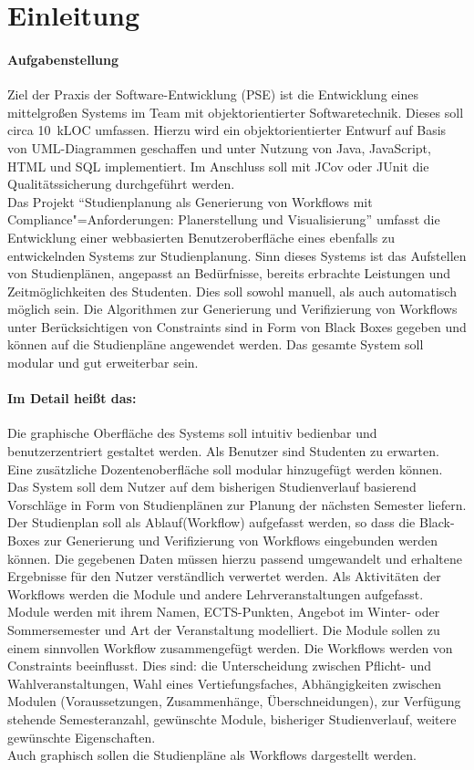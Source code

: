 \section{Einleitung}
\paragraph{Aufgabenstellung}
Ziel der Praxis der Software-Entwicklung (PSE) ist die Entwicklung eines mittelgroßen Systems im Team mit objektorientierter Softwaretechnik. Dieses soll circa 10~kLOC umfassen. Hierzu wird ein objektorientierter Entwurf auf Basis von UML-Diagrammen geschaffen und unter Nutzung von Java, JavaScript, HTML und SQL implementiert. Im Anschluss soll mit JCov oder JUnit die Qualitätssicherung durchgeführt werden.\\
Das Projekt \enquote{Studienplanung als Generierung von Workflows mit Compliance"=Anforderungen: Planerstellung und Visualisierung} umfasst die Entwicklung einer webbasierten Benutzeroberfläche eines ebenfalls zu entwickelnden Systems zur Studienplanung. Sinn dieses Systems ist das Aufstellen von Studienplänen, angepasst an Bedürfnisse, bereits erbrachte Leistungen und Zeitmöglichkeiten des Studenten. Dies soll sowohl manuell, als auch automatisch möglich sein. Die Algorithmen zur Generierung und Verifizierung von Workflows unter Berücksichtigen von Constraints sind in Form von Black Boxes gegeben und können auf die Studienpläne angewendet werden. Das gesamte System soll modular und gut erweiterbar sein.\\
\paragraph{Im Detail heißt das:}
Die graphische Oberfläche des Systems soll intuitiv bedienbar und benutzerzentriert gestaltet werden. Als Benutzer sind Studenten zu erwarten. Eine zusätzliche Dozentenoberfläche soll modular hinzugefügt werden können. Das System soll dem Nutzer auf dem bisherigen Studienverlauf basierend Vorschläge in Form von Studienplänen zur Planung der nächsten Semester liefern. Der Studienplan soll als Ablauf(Workflow) aufgefasst werden, so dass die Black-Boxes zur Generierung und Verifizierung von Workflows eingebunden werden können. Die gegebenen Daten müssen hierzu passend umgewandelt und erhaltene Ergebnisse für den Nutzer verständlich verwertet werden. Als Aktivitäten der Workflows werden die Module und andere Lehrveranstaltungen aufgefasst. Module werden mit ihrem Namen, ECTS-Punkten, Angebot im Winter- oder Sommersemester und Art der Veranstaltung modelliert. Die Module sollen zu einem sinnvollen Workflow zusammengefügt werden. Die Workflows werden von Constraints beeinflusst. Dies sind: die Unterscheidung zwischen Pflicht- und Wahlveranstaltungen, Wahl eines Vertiefungsfaches, Abhängigkeiten zwischen Modulen (Voraussetzungen, Zusammenhänge, Überschneidungen), zur Verfügung stehende Semesteranzahl, gewünschte Module, bisheriger Studienverlauf, weitere gewünschte Eigenschaften.\\
Auch graphisch sollen die Studienpläne als Workflows dargestellt werden.